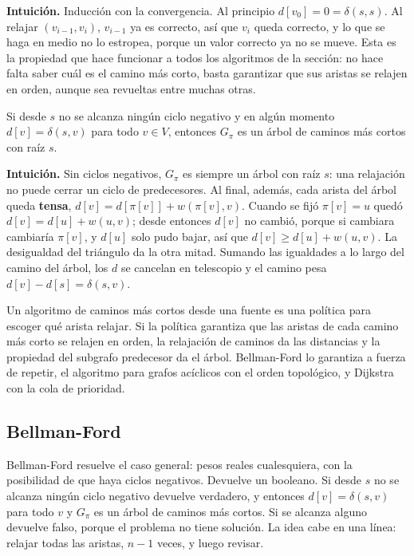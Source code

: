 \documentclass[11pt,letterpaper]{article}
\begin{document}
\textbf{Intuición.} Inducción con la convergencia. Al principio
$d[v_0] = 0 = \delta(s, s)$. Al relajar $(v_{i-1}, v_i)$, $v_{i-1}$
ya es correcto, así que $v_i$ queda correcto, y lo que se haga en
medio no lo estropea, porque un valor correcto ya no se mueve. Esta
es la propiedad que hace funcionar a todos los algoritmos de la
sección: no hace falta saber cuál es el camino más corto, basta
garantizar que sus aristas se relajen en orden, aunque sea revueltas
entre muchas otras.

\begin{proposicion}
  \label{prop:subgrafo-pred}
  Si desde $s$ no se alcanza ningún ciclo negativo y en algún momento
  $d[v] = \delta(s, v)$ para todo $v \in V$, entonces $G_\pi$ es un
  árbol de caminos más cortos con raíz $s$.
\end{proposicion}

\textbf{Intuición.} Sin ciclos negativos, $G_\pi$ es siempre un árbol
con raíz $s$: una relajación no puede cerrar un ciclo de
predecesores. Al final, además, cada arista del árbol queda
\textbf{tensa}, $d[v] = d[\pi[v]] + w(\pi[v], v)$. Cuando se fijó
$\pi[v] = u$ quedó $d[v] = d[u] + w(u, v)$; desde entonces $d[v]$ no
cambió, porque si cambiara cambiaría $\pi[v]$, y $d[u]$ solo pudo
bajar, así que $d[v] \ge d[u] + w(u, v)$. La desigualdad del
triángulo da la otra mitad. Sumando las igualdades a lo largo del
camino del árbol, los $d$ se cancelan en telescopio y el camino pesa
$d[v] - d[s] = \delta(s, v)$.

\begin{idea}
  Un algoritmo de caminos más cortos desde una fuente es una política
  para escoger qué arista relajar. Si la política garantiza que las
  aristas de cada camino más corto se relajen en orden, la relajación
  de caminos da las distancias y la propiedad del subgrafo predecesor
  da el árbol. Bellman-Ford lo garantiza a fuerza de repetir, el
  algoritmo para grafos acíclicos con el orden topológico, y Dijkstra
  con la cola de prioridad.
\end{idea}


\subsection*{Bellman-Ford}

Bellman-Ford resuelve el caso general: pesos reales cualesquiera, con
la posibilidad de que haya ciclos negativos. Devuelve un booleano. Si
desde $s$ no se alcanza ningún ciclo negativo devuelve verdadero, y
entonces $d[v] = \delta(s, v)$ para todo $v$ y $G_\pi$ es un árbol de
caminos más cortos. Si se alcanza alguno devuelve falso, porque el
problema no tiene solución. La idea cabe en una línea: relajar todas
las aristas, $n - 1$ veces, y luego revisar.
\end{document}
